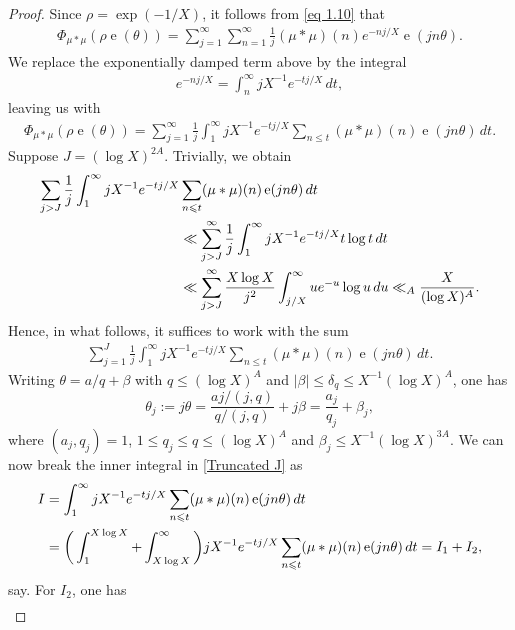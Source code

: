 \documentclass[10pt,a4paper]{amsart}
\newcommand{\e}{\operatorname{e}}
\begin{document}
\begin{proof} Since $\rho = \exp(-1/X)$, it follows from \eqref{eq 1.10} that
\begin{align*}
    \Phi_{\mu * \mu}(\rho \e(\theta)) = \sum_{j=1}^\infty\sum_{n=1}^\infty \frac{1}{j} (\mu * \mu)(n) e^{-nj / X} \e(j n \theta).
\end{align*}
We replace the exponentially damped term above by the integral
\begin{align*}
    e^{-nj / X} = \int_n^\infty jX^{-1}e^{-tj/X}\, dt,
\end{align*}
leaving us with
\begin{align*}
    \Phi_{\mu * \mu}(\rho \e(\theta)) = \sum_{j=1}^\infty \frac{1}{j} \int_1^\infty jX^{-1}e^{-tj/X} \sum_{n \leqslant t}  (\mu * \mu)(n) \e(j n \theta) \, dt.
\end{align*}
Suppose $J=(\log X)^{2A}$. Trivially, we obtain
\begin{align}\label{Integral Truncating}
\sum_{j>J}\frac{1}{j} \int_1^\infty jX^{-1}e^{-tj/X} &\sum_{n \leqslant t}  (\mu * \mu)(n) \e(j n \theta) \, dt \notag \\
   & \ll \sum_{j>J}^\infty \frac{1}{j} \int_1^\infty jX^{-1}e^{-tj/X} t \log t \, dt  \notag \\
   &\ll \sum_{j>J}^\infty \frac{X \log X}{j^2} \int_{j/X}^\infty ue^{-u} \log u  \, du \ll_A \frac{X}{(\log X)^{A}}.
\end{align}
Hence, in what follows, it suffices to work with the sum
\begin{align}\label{Truncated J}
\sum_{j=1}^J \frac{1}{j} \int_1^\infty jX^{-1}e^{-tj/X} \sum_{n \leqslant t}  (\mu * \mu)(n) \e(j n \theta) \, dt.
\end{align}
Writing $\theta=a/q+\beta$ with $q\leqslant(\log X)^A$ and $|\beta|\leqslant\delta_q \leqslant X ^{-1}(\log X)^A$, one has
\[ \theta _j := j\theta = \frac{aj/(j,q)}{q/(j,q)}+ j\beta = \frac{a _j}{q _j}+\beta _j,
\]
where $(a _j,q _j)=1$, $1 \leqslant q _j \leqslant q \leqslant(\log X)^{A} $ and $\beta _j \leqslant X ^{-1}(\log X)^{3A}$. We can now break the inner integral in \eqref{Truncated J} as
\begin{align}
  I &= \int_1^\infty jX^{-1}e^{-tj/X} \sum_{n \leqslant t}  (\mu * \mu)(n) \e(j n \theta) \, dt \notag \\
  &= \bigg(\int_1^{X \log X} + \int_{X\log X}^\infty\bigg) jX^{-1}e^{-tj/X} \sum_{n \leqslant t}  (\mu * \mu)(n) \e(j n \theta) \, dt = I_1+I_2 \notag, 
\end{align}
say. For $I_2$, one has
\begin{align}

\end{align}
\end{proof}
\end{document}
